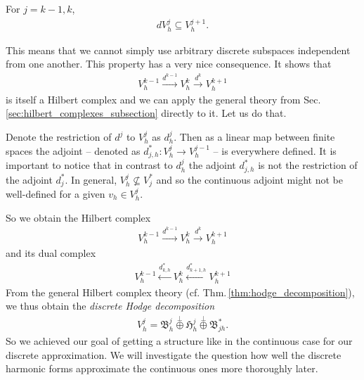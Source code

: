 \documentclass[../master_thesis.tex]{subfiles}
\begin{document}
\begin{assumption}
    For $j = k-1, k$,
    \begin{align*}
        dV_h^j \subseteq V_h^{j+1}.
    \end{align*}    
\end{assumption}
This means that we cannot simply use arbitrary 
discrete subspaces independent from one another. This property has a very nice
consequence. 
It shows that 
\begin{align*}
    V_h^{k-1} \xrightarrow{d^{k-1}} V_h^k \xrightarrow{d^k} V_h^{k+1}
\end{align*}
is itself a Hilbert complex and we can apply the general theory from 
Sec.\,\ref{sec:hilbert_complexes_subsection} directly to it. Let us do that.

Denote the restriction of $d^j$ to $V_h^j$ as $d_h^j$. Then as a linear map 
between finite spaces the adjoint -- denoted as $d_{j,h}^*: V_h^j \rightarrow V_h^{j-1}$ -- 
is everywhere defined. It is important to notice that in contrast to $d^j_h$ 
the adjoint $d^*_{j,h}$ is not the restriction of the adjoint $d^*_j$.
In general, $V^j_h \not\subseteq V_j^*$ and so the continuous adjoint might not be 
well-defined for a given $v_h \in V^j_h$. 

So we obtain the Hilbert complex
\begin{align}
    V_h^{k-1} \xrightarrow{d^{k-1}} V_h^{k} \xrightarrow{d^{k}} V_h^{k+1}\label{eq:discrete_hilbert_complex}
\end{align}
and its dual complex
\begin{align*}
    V_h^{k-1} \xleftarrow{d^*_{k,h}} V_h^{k} \xleftarrow{d^*_{k+1,h}} V_h^{k+1}
\end{align*}
From the general Hilbert complex theory (cf. Thm.\,\ref{thm:hodge_decomposition}),
we thus obtain the \textit{discrete Hodge decomposition}
\begin{align*}
    V_h^j = \mathfrak{B}^j_h \stackrel{\perp}{\oplus} \mathfrak{H}^j_h \stackrel{\perp}{\oplus}
        \mathfrak{B}^*_{jh}.
\end{align*}
So we achieved our goal of getting a structure like in the continuous case 
for our discrete approximation. We  will investigate the question how well the discrete harmonic 
forms approximate the continuous ones more thoroughly later.
\end{document}
